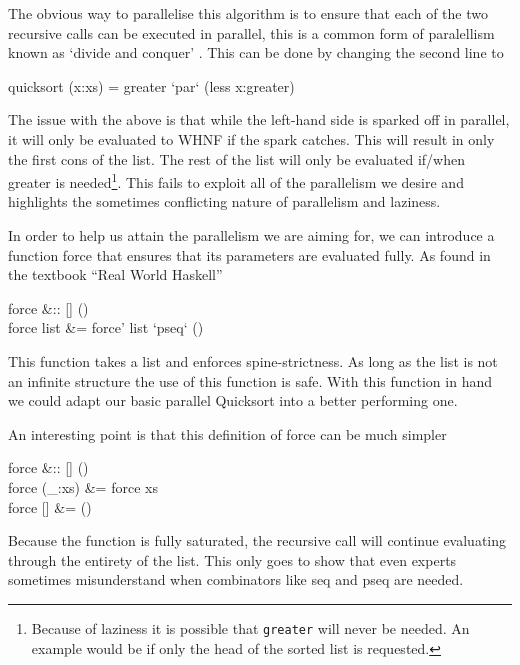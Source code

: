 The obvious way to parallelise this algorithm is to ensure that each of the two
recursive calls can be executed in parallel, this is a common form of
paralellism known as `divide and conquer' . This can be done by changing the second line to

\begin{haskell}
quicksort (x:xs) = greater `par` (less \hsapp x:greater)
\end{haskell}

The issue with the above is that while the left-hand side is sparked off in
parallel, it will only be evaluated to WHNF if the spark catches. This will
result in only the first \<cons\> of the list. The rest of the list will
only be evaluated if/when \<greater\> is needed\footnote{Because of
laziness it is possible that \texttt{greater} will never be needed. An
example would be if only the head of the sorted list is requested.}. This
fails to exploit all of the parallelism we desire and highlights the sometimes
conflicting nature of parallelism and laziness.

    In order to help us attain the parallelism we are aiming for, we can
introduce a function \<force\> that ensures that its parameters are evaluated
fully. As found in the textbook ``Real World Haskell'' \citep{realWorld}

\begin{haskell}
force &:: [\hasalpha] \to ()\\
force list &= force' list `pseq` ()
\end{haskell}

This function takes a list and enforces spine-strictness. As long as the list is
not an infinite structure the use of this function is safe. With this function
in hand we could adapt our basic parallel Quicksort into a better performing one.

An interesting point is that this definition of \<force\> can be much simpler

\begin{haskell}
force &:: [\hasalpha] \to () \\
force (\_:xs) &= force xs\\
force []           &= ()
\end{haskell}

Because the function is fully saturated, the recursive call will continue
evaluating through the entirety of the list. This only goes to show that even
experts sometimes misunderstand when combinators like \<seq\> and \<pseq\> are
needed.

